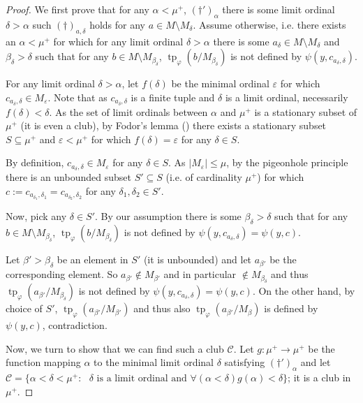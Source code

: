 \documentclass[a4paper]{amsart}
\theoremstyle{plain}
\theoremstyle{definition}
\theoremstyle{remark}
\numberwithin{equation}{section}
\DeclareMathOperator{\tp}{tp}
\begin{document}
\begin{proof}
We first prove that  for any $\alpha<\mu^+$, $(\dagger')_\alpha$ there is some limit ordinal $\delta>\alpha$ such $(\dagger)_{a,\delta}$ holds for any $a\in M\setminus M_\delta$. Assume otherwise, i.e. there exists an $\alpha<\mu^+$ for which for any limit ordinal $\delta>\alpha$ there is some $a_\delta\in M\setminus M_\delta$ and $\beta_\delta>\delta$ such that for any $b\in M\setminus M_{\beta_\delta}$, $\tp_\varphi(b/M_{\beta_\delta})$ is not defined by $\psi(y,c_{a_\delta,\delta})$.

For any limit ordinal $\delta>\alpha$, let $f(\delta)$ be the minimal ordinal $\varepsilon$ for which $c_{a_\delta,\delta}\in M_\varepsilon$. Note that as $c_{a_\delta,\delta}$ is a finite tuple and $\delta$ is a limit ordinal, necessarily $f(\delta)<\delta$. As the set of limit ordinals between $\alpha$ and $\mu^+$ is a stationary subset of $\mu^+$ (it is even a club), by Fodor's lemma (\cite[Theorem 8.7]{jech}) there exists a stationary subset $S\subseteq \mu^+$ and $\varepsilon<\mu^+$ for which $f(\delta)=\varepsilon$ for any $\delta\in S$.

By definition, $c_{a_\delta,\delta}\in M_\varepsilon$ for any $ \delta\in S$. As $|M_\varepsilon|\leq \mu$, by the pigeonhole principle there is an unbounded subset $S'\subseteq S$ (i.e. of cardinality $\mu^+$) for which $c:=c_{a_{\delta_1},\delta_1}=c_{a_{\delta_2},\delta_2}$ for any $\delta_1,\delta_2\in S'$.

Now, pick any $\delta\in S'$. By our assumption there is some $\beta_\delta>\delta$ such that for any $b\in M\setminus M_{\beta_\delta}$, $\tp_\varphi(b/M_{\beta_\delta})$ is not defined by $\psi(y,c_{a_\delta,\delta})=\psi(y,c)$.

Let $\beta'>\beta_\delta$ be an element in $S'$ (it is unbounded) and let $a_{\beta'}$ be the corresponding element. So $a_{\beta'}\notin M_{\beta'}$ and in particular $\notin  M_{\beta_\delta}$ and thus $\tp_\varphi(a_{\beta'}/M_{\beta_\delta})$ is not defined by $\psi(y,c_{a_\delta,\delta})=\psi(y,c)$. On the other hand, by choice of $S'$, $\tp_\varphi(a_{\beta'}/M_{\beta'})$ and thus also $\tp_\varphi(a_{\beta'}/M_\beta)$ is defined by $\psi(y,c)$, contradiction. 

Now, we turn to show that we can find such a club $\mathcal{C}$. Let $g:\mu^+\to \mu^+$ be the function mapping $\alpha$ to the minimal limit ordinal $\delta$ satisfying $(\dagger')_\alpha$ and let $\mathcal{C}=\{\alpha<\delta<\mu^+: \text{ $\delta$ is a limit ordinal and } \forall(\alpha<\delta) g(\alpha)<\delta\}$; it is a club in $\mu^+$.


\end{proof}
\end{document}
